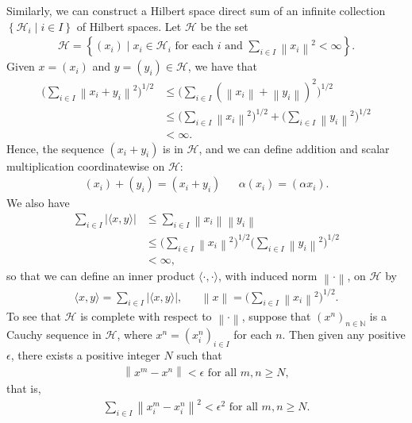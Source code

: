 \documentclass[11pt,a4paper]{report}
\theoremstyle{plain}
\theoremstyle{definition}
\newcommand{\1}{\mathbbm{1}}
\newcommand{\N}{\mathbb{N}}
\renewcommand{\H}{\mathcal{H}}
\begin{document}
Similarly, we can construct a Hilbert space direct sum of an infinite collection $\left\{\H_i \mid i\in I\right\}$ of Hilbert spaces. Let $\H$ be the set
\begin{align*}
	\H= \left\{(x_i) \mid x_i \in \H_i \mbox{ for each }i 
									\mbox{ and } \sum_{i\in I}{\left\|x_i\right\|^2} < \infty \right\}.
\end{align*}
Given $x=(x_i)$ and $y=(y_i)\in\H$, we have that
\begin{align*}
			\Big(\sum_{i\in I}{\left\|x_i+y_i\right\|^2}\Big)^{1/2}
	&\leq	\Big(\sum_{i\in I}{(\left\|x_i\right\|+\left\|y_i\right\|)^2}\Big)^{1/2}				\\
	&\leq	\Big(\sum_{i\in I}{\left\|x_i\right\|^2}\Big)^{1/2}		+
						\Big(\sum_{i\in I}{\left\|y_i\right\|^2}\Big)^{1/2}		\\
	&< 		\infty.
\end{align*}
Hence, the sequence $(x_i+y_i)$ is in $\H$, and we can define addition and scalar multiplication coordinatewise on $\H$:
\begin{align*}
	(x_i)+(y_i)=(x_i+y_i) && \alpha(x_i) = (\alpha x_i).
\end{align*}
We also have
\begin{align*}
			\sum_{i\in I}{\left|\langle x,y\rangle\right|} 
	&\leq	\sum_{i\in I}{\left\|x_i\right\|	\left\|y_i\right\|}					\\
	&\leq 	\Big(\sum_{i\in I}{\left\|x_i\right\|^2}\Big)^{1/2}
							\Big(\sum_{i\in I}{\left\|y_i\right\|^2}\Big)^{1/2}		\\
	&< \infty,
\end{align*}
so that we can define an inner product $\langle\cdot,\cdot\rangle$, with induced norm $\left\|\cdot\right\|$, on $\H$ by
\begin{align*}
	\langle x,y\rangle = \sum_{i\in I}{\left|\langle x,y\rangle\right|}, 
					&& \left\|x\right\| = \Big(\sum_{i\in I}{\left\|x_i\right\|^2}\Big)^{1/2}.
\end{align*}
To see that $\H$ is complete with respect to $\left\|\cdot\right\|$, suppose that $(x^{n})_{n\in\N}$ is a Cauchy sequence in $\H$, where $x^{n} = (x^n_i)_{i\in I}$ for each $n$. Then given any positive $\epsilon$, there exists a positive integer $N$ such that
\begin{align*}
	\left\|x^m-x^n\right\| < \epsilon \mbox{ for all } m,n\geq N,
\end{align*}
that is,
\begin{align}\label{eqn:sum1}
	\sum_{i\in I}{\left\|x^m_i-x^n_i\right\|^2} < \epsilon^2 \mbox{ for all } m,n\geq N.
\end{align}
\end{document}
